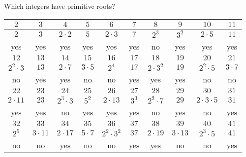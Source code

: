 \documentclass{beamer}
\begin{document}
\begin{frame}{Which integers have primitive roots?}
\begin{adjustwidth}{-2em}{-2em}
\small
\begin{tabular}{|c|c|c|c|c|c|c|c|c|c|}\hline
$2$           &  $3$         & $4$           &   $5$         & $6$            & $7$   & $8$          & $9$         & $10$            & $11$       \\ \hline
$2$           &  $3$         & $2\cdot2$     &   $5$         & $2\cdot3$      & $7$   & $2^3$        & $3^2$       & $2\cdot 5$      & $11$       \\ \hline
yes           &  yes         &  yes          &   yes         & yes            & yes   & no           & yes         & yes             & yes        \\ \hline\hline
$12$          &  $13$        & $14$          &   $15$        & $16$           & $17$  & $18$         & $19$        & $20$            & $21$       \\ \hline
$2^2\cdot3$   &  $13$        & $2\cdot7$     &   $3\cdot 5$  & $2^4$          & $17$  & $2\cdot 3^2$ & $19$        & $2^2\cdot 5$    & $3\cdot 7$ \\ \hline
no            &  yes         &  yes          &   no          & no             & yes   & yes          & yes         & no              & no         \\ \hline\hline
$22$          &  $23$        & $24$          &   $25$        & $26$           & $27$  & $28$         & $29$        & $30$            & $31$       \\ \hline
$2\cdot11$    &  $23$        & $2^3\cdot 3$  &   $5^2$       & $2\cdot 13$    & $3^3$ & $2^2\cdot 7$ & $29$        & $2\cdot3\cdot5$ & $31$       \\ \hline
yes           &  yes         &  no           &   yes         & yes            & yes   & no           & yes         & no              & yes        \\ \hline\hline
$32$          &  $33$        & $34$          &   $35$        & $36$           & $37$  & $38$         & $39$        & $40$            & $41$       \\ \hline
$2^5$         &  $3\cdot 11$ & $2\cdot 17$   &   $5\cdot 7$  & $2^2\cdot 3^2$ & $37$  & $2\cdot 19$  & $3\cdot 13$ & $2^3\cdot 5$    & $41$       \\ \hline
no            &  no          &  yes          &   no          & no             & yes   & yes          & no          & no              & yes        \\ \hline
\end{tabular}
\normalsize
\end{adjustwidth}

\end{frame}
\end{document}
